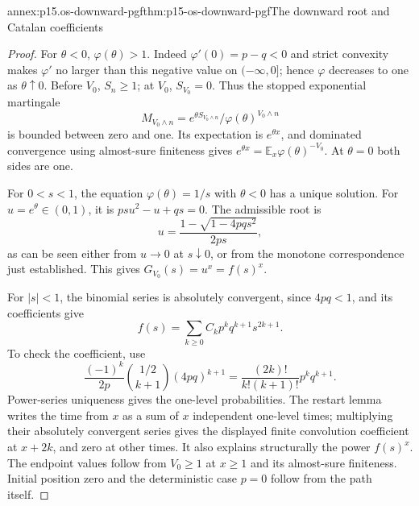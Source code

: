 \begin{annexitem}{annex:p15.os-downward-pgf}{thm:p15-os-downward-pgf}{The downward root and Catalan coefficients}
\begin{proof}
For \(\theta<0\), \(\varphi(\theta)>1\).
Indeed \(\varphi'(0)=p-q<0\) and strict convexity makes
\(\varphi'\) no larger than this negative value on
\((-\infty,0]\); hence \(\varphi\) decreases to one as
\(\theta\uparrow0\). Before \(V_0\), \(S_n\geq1\);
at \(V_0\), \(S_{V_0}=0\).
Thus the stopped exponential martingale
\[
 M_{V_0\wedge n}
       =e^{\theta S_{V_0\wedge n}}/
                          \varphi(\theta)^{V_0\wedge n}
 \]
is bounded between zero and one.
Its expectation is \(e^{\theta x}\), and dominated convergence
using almost-sure finiteness gives
\(e^{\theta x}=\mathbb E_x\varphi(\theta)^{-V_0}\).
At \(\theta=0\) both sides are one.

For \(0<s<1\), the equation
\(\varphi(\theta)=1/s\) with \(\theta<0\) has a unique solution.
For \(u=e^\theta\in(0,1)\), it is
\(psu^2-u+qs=0\).
The admissible root is
\[
 u=\frac{1-\sqrt{1-4pqs^2}}{2ps},
 \]
as can be seen either from \(u\to0\) at \(s\downarrow0\),
or from the monotone correspondence just established.
This gives \(G_{V_0}(s)=u^x=f(s)^x\).

For \(|s|<1\), the binomial series is absolutely convergent,
since \(4pq<1\), and its coefficients give
\[
 f(s)=\sum_{k\geq0} C_kp^kq^{k+1}s^{2k+1}.
 \]
To check the coefficient, use
\[
 \frac{(-1)^k}{2p}\binom{1/2}{k+1}(4pq)^{k+1}
 =\frac{(2k)!}{k!(k+1)!}p^kq^{k+1}.
 \]
Power-series uniqueness gives the one-level probabilities.
The restart lemma writes the time from \(x\) as a sum of \(x\)
independent one-level times; multiplying their absolutely
convergent series gives the displayed finite convolution
coefficient at \(x+2k\), and zero at other times.
It also explains structurally the power \(f(s)^x\).
The endpoint values follow from \(V_0\geq1\) at \(x\geq1\)
and its almost-sure finiteness. Initial position zero and the
deterministic case \(p=0\) follow from the path itself.
\end{proof}
\end{annexitem}

